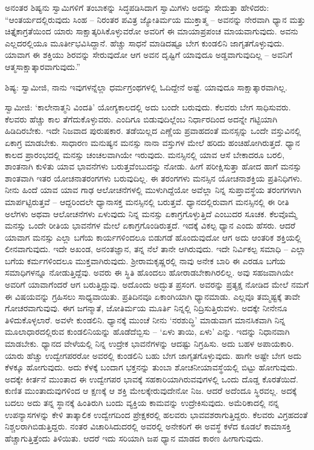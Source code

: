 ಅನಂತರ ಶಿಷ್ಯನು ಸ್ವಾಮಿಗಳಿಗೆ ತಂಬಾಕನ್ನು ಸಿದ್ಧಪಡಿಸಿದಾಗ ಸ್ವಾಮಿಗಳು ಅದನ್ನು ಸೇದುತ್ತಾ ಹೇಳಿದರು: “ಆಂತರ್ಯದಲ್ಲಿರುವುದು ಸಿಂಹ – ನಿರಂತರ ಪವಿತ್ರ ಜ್ಯೋತಿರ್ಮಯ ಮುಕ್ತಾತ್ಮ – ಅವನನ್ನು ನೇರವಾಗಿ ಧ್ಯಾನ ಮತ್ತು ಚಿತ್ತೈಕಾಗ್ರತೆಯಿಂದ ಯಾರು ಸಾಕ್ಷಾತ್ಕರಿಸಿಕೊಳ್ಳುವರೋ ಅವರಿಗೆ ಈ ಮಾಯಾಪ್ರಪಂಚ ಮಾಯವಾಗುವುದು. ಅವನು ಎಲ್ಲದರಲ್ಲಿಯೂ ಮೂರ್ತೀಭವಿಸಿದ್ದಾನೆ. ಹೆಚ್ಚು ಸಾಧನೆ ಮಾಡಿದಷ್ಟೂ ಬೇಗ ಕುಂಡಲಿನಿ ಜಾಗೃತಗೊಳ್ಳುವುದು. ಯಾವಾಗ ಈ ಶಕ್ತಿಯು ಶಿರವನ್ನು ಸೇರುವುದೋ ಆಗ ಅವನ ದೃಷ್ಟಿಗೆ ಯಾವುದೂ ಅಡ್ಡವಾಗುವುದಿಲ್ಲ – ಅವನಿಗೆ ಆತ್ಮಸಾಕ್ಷಾತ್ಕಾರವಾಗುವುದು.”

ಶಿಷ್ಯ: ಸ್ವಾಮೀಜಿ, ನಾನು ಇವುಗಳನ್ನೆಲ್ಲಾ ಧರ್ಮಗ್ರಂಥಗಳಲ್ಲಿ ಓದಿದ್ದೇನೆ ಅಷ್ಟೆ. ಯಾವುದೂ ಸಾಕ್ಷಾತ್ಕಾರವಾಗಿಲ್ಲ.

ಸ್ವಾಮೀಜಿ: ‘ಕಾಲೇನಾತ್ಮನಿ ವಿಂದತಿ’ ಯೋಗ್ಯಕಾಲದಲ್ಲಿ ಅದು ಬಂದೇ ಬರುವುದು. ಕೆಲವರು ಬೇಗ ಸಾಧಿಸುವರು. ಕೆಲವರು ಹೆಚ್ಚು ಕಾಲ ತೆಗೆದುಕೊಳ್ಳುವರು. ಎಂದಿಗೂ ಬಿಡುವುದಿಲ್ಲೆಂಬ ನಿರ್ಧಾರದಿಂದ ಅದನ್ನೇ ಗಟ್ಟಿಯಾಗಿ ಹಿಡಿದಿರಬೇಕು. ಇದೇ ನಿಜವಾದ ಪುರುಷಕಾರ. ತಡೆಯಿಲ್ಲದ ಎಣ್ಣೆಯ ಪ್ರವಾಹದಂತೆ ಮನಸ್ಸನ್ನು ಒಂದೇ ವಸ್ತುವಿನಲ್ಲಿ ಏಕಾಗ್ರ ಮಾಡಬೇಕು. ಸಾಧಾರಣ ಮನುಷ್ಯನ ಮನಸ್ಸು ನಾನಾ ವಸ್ತುಗಳ ಮೇಲೆ ಹರಿದು ಹಂಚಿಹೋಗಿರುತ್ತದೆ. ಧ್ಯಾನ ಕಾಲದ ಪ್ರಾರಂಭದಲ್ಲಿ ಮನಸ್ಸು ಚಂಚಲವಾಗಿಯೇ ಇರುವುದು. ಮನಸ್ಸಿನಲ್ಲಿ ಯಾವ ಆಸೆ ಬೇಕಾದರೂ ಬರಲಿ, ಶಾಂತನಾಗಿ ಕುಳಿತು ಯಾವ ಭಾವನೆಗಳು ಬರುತ್ತವೆಂಬುದನ್ನು ನೋಡು. ಹೀಗೆ ಪರೀಕ್ಷಿಸುತ್ತಾ ಹೋದ ಹಾಗೆ ಮನಸ್ಸು ಶಾಂತವಾಗಿ ಇತರ ಯೋಚನಾತರಂಗಗಳು ಬರುವುದಿಲ್ಲ. ಈ ತರಂಗಗಳು ಮನಸ್ಸಿನ ಯೋಚನಾಶಕ್ತಿಯ ಪ್ರತಿನಿಧಿಗಳು. ನೀನು ಹಿಂದೆ ಯಾವ ಯಾವ ಗಾಢ ಆಲೋಚನೆಗಳಲ್ಲಿ ಮುಳುಗಿದ್ದೆಯೋ ಅವೆಲ್ಲಾ ನಿನ್ನ ಸುಪ್ತಾವಸ್ಥೆಯ ತರಂಗಗಳಾಗಿ ಮಾರ್ಪಟ್ಟಿರುತ್ತವೆ – ಆದ್ದರಿಂದಲೇ ಧ್ಯಾನಾಸಕ್ತ ಮನಸ್ಸಿನಲ್ಲಿ ಬರುತ್ತವೆ. ಧ್ಯಾನದಲ್ಲಿರುವಾಗ ಮನಸ್ಸಿನಲ್ಲಿ ಈ ರೀತಿ ಅಲೆಗಳು ಅಥವಾ ಆಲೋಚನೆಗಳು ಏಳುವುದು ನಿನ್ನ ಮನಸ್ಸು ಏಕಾಗ್ರಗೊಳ್ಳುತ್ತಿದೆ ಎಂಬುದರ ಸೂಚಕ. ಕೆಲವೊಮ್ಮೆ ಮನಸ್ಸು ಒಂದೇ ರೀತಿಯ ಭಾವನೆಗಳ ಮೇಲೆ ಏಕಾಗ್ರಗೊಂಡಿರುತ್ತದೆ. ಇದಕ್ಕೆ ವಿಕಲ್ಪ ಧ್ಯಾನ ಎಂದು ಹೆಸರು. ಆದರೆ ಯಾವಾಗ ಮನಸ್ಸು ಎಲ್ಲಾ ಬಗೆಯ ಕಾರ್ಯಗಳಿಂದಲೂ ಬಿಡುಗಡೆ ಹೊಂದುವುದೋ ಆಗ ಅದು ಆಂತರಿಕ ಶಕ್ತಿಯಲ್ಲಿ ಲೀನವಾಗುವುದು. ಇದೇ ಅಖಂಡ, ಅನಂತಜ್ಞಾನ, ತನ್ನ ನೆಲೆ ತಾನೇ ಆಗಿರುವುದು. ಇದೇ ನಿರ್ವಿಕಲ್ಪ ಸಮಾಧಿ – ಎಲ್ಲಾ ಬಗೆಯ ಕರ್ಮಗಳಿಂದಲೂ ಮುಕ್ತವಾಗಿರುವುದು. ಶ‍್ರೀರಾಮಕೃಷ್ಣರಲ್ಲಿ ನಾವು ಅನೇಕ ಬಾರಿ ಈ ಎರಡೂ ಬಗೆಯ ಸಮಾಧಿಗಳನ್ನೂ ನೋಡುತ್ತಿದ್ದೆವು. ಅವರು ಈ ಸ್ಥಿತಿ ಹೊಂದಲು ಹೋರಾಡಬೇಕಾಗಿರಲಿಲ್ಲ. ಅವು ಸಹಜವಾಗಿಯೇ ಅವರಿಗೆ ಯಾವಾಗೆಂದರೆ ಆಗ ಬರುತ್ತಿದ್ದುವು. ಅದೊಂದು ಅದ್ಭುತ ಪ್ರಸಂಗ. ಅವರನ್ನು ಪ್ರತ್ಯಕ್ಷ ನೋಡಿದ ಮೇಲೆ ನಮಗೆ ಈ ವಿಷಯವನ್ನು ಗ್ರಹಿಸಲು ಸಾಧ್ಯವಾಯಿತು. ಪ್ರತಿದಿನವೂ ಏಕಾಂಗಿಯಾಗಿ ಧ್ಯಾನಮಾಡು. ಎಲ್ಲವೂ ತಮ್ಮಷ್ಟಕ್ಕೆ ತಾವೇ ಗೋಚರವಾಗುವುವು. ಈಗ ಜಗನ್ಮಾತೆ, ಜೋತಿರ್ಮಯ ಮೂರ್ತಿ ನಿನ್ನಲ್ಲಿ ನಿದ್ರಿಸುತ್ತಿರುವಳು. ಅದಕ್ಕೇ ನೀನೇನೂ ತಿಳಿದುಕೊಳ್ಳಲಾರೆ. ಅವಳೇ ಕುಂಡಲಿನಿ. ಧ್ಯಾನಕ್ಕೆ ಮುಂಚೆ ನೀನು ‘ನರಶುದ್ಧಿ’ ಮಾಡುವಾಗ ಮಾನಸಿಕವಾಗಿ ನಿನ್ನ ಮೂಲಾಧಾರದಲ್ಲಿರುವ ಕುಂಡಲಿನಿಯನ್ನು ಹೊಡೆದೆಬ್ಬಿಸು – ‘ಏಳು ತಾಯಿ, ಏಳು’ ಎನ್ನು. ಇದನ್ನು ನಿಧಾನವಾಗಿ ಮಾಡಬೇಕು. ಧ್ಯಾನದ ವೇಳೆಯಲ್ಲಿ ನಿನ್ನ ಉದ್ರೇಕ ಭಾವನೆಗಳನ್ನು ಆದಷ್ಟು ನಿಗ್ರಹಿಸು. ಅದು ಬಹಳ ಅಪಾಯಕಾರಿ. ಯಾರು ಹೆಚ್ಚು ಉದ್ವೇಗಪರರೋ ಅವರಲ್ಲಿ ಕುಂಡಲಿನಿ ಬಹು ಬೇಗ ಜಾಗೃತಗೊಳ್ಳುವುದು. ಹಾಗೇ ಅಷ್ಟೇ ಬೇಗ ಅದು ಕೆಳಕ್ಕೂ ಹೋಗುವುದು. ಅದು ಕೆಳಕ್ಕೆ ಬಂದಾಗ ಭಕ್ತನನ್ನು ತುಂಬಾ ಶೋಚನೀಯಾವಸ್ಥೆಯಲ್ಲಿ ಬಿಟ್ಟು ಹೋಗುವುದು. ಅದಕ್ಕೇ ಕೀರ್ತನೆ ಮುಂತಾದ ಈ ಉದ್ವೇಗಪರ ಭಾವಕ್ಕೆ ಸಹಕಾರಿಯಾಗಿರುವವುಗಳಲ್ಲಿ ಒಂದು ದೊಡ್ಡ ಕೊರತೆಯಿದೆ. ಕುಣಿತ ಮುಂತಾದುವುಗಳಿಂದ ಆ ಕ್ಷಣಕ್ಕೆ ಆ ಶಕ್ತಿ ಮೇಲಕ್ಕೇರುವುದೇನೋ ನಿಜ. ಆದರೆ ಅದೆಂದೂ ಸ್ಥಿರವಲ್ಲ. ಅದಕ್ಕೆ ಬದಲು ಅದು ತನ್ನ ಸ್ಥಾನಕ್ಕೆ ಹಿಂತಿರುಗಿ ಬಂದು ವ್ಯಕ್ತಿಯ ಕಾಮವನ್ನು ಉದ್ರೇಕಿಸುವುದು. ಅಮೆರಿಕಾದಲ್ಲಿ ನನ್ನ ಉಪನ್ಯಾಸಗಳನ್ನು ಕೇಳಿ ತಾತ್ಕಾಲಿಕ ಉದ್ವೇಗದಿಂದ ಪ್ರೇಕ್ಷಕರಲ್ಲಿ ಹಲವರು ಭಾವವಶರಾಗುತ್ತಿದ್ದರು. ಕೆಲವರು ವಿಗ್ರಹದಂತೆ ನಿಶ್ಚಲರಾಗಿಬಿಡುತ್ತಿದ್ದರು. ನಂತರ ವಿಚಾರಿಸಿದುದರಲ್ಲಿ ಅವರಲ್ಲಿ ಅನೇಕರಿಗೆ ಈ ಅವಸ್ಥೆ ಕಳೆದ ಕೂಡಲೆ ಕಾಮಾಸಕ್ತಿ ಹೆಚ್ಚಾಗುತ್ತಿತ್ತೆಂದು ತಿಳಿಯಿತು. ಆದರೆ ಇದು ಸರಿಯಾಗಿ ಜಪ ಧ್ಯಾನ ಮಾಡದ ಕಾರಣ ಹೀಗಾಗುವುದು.

